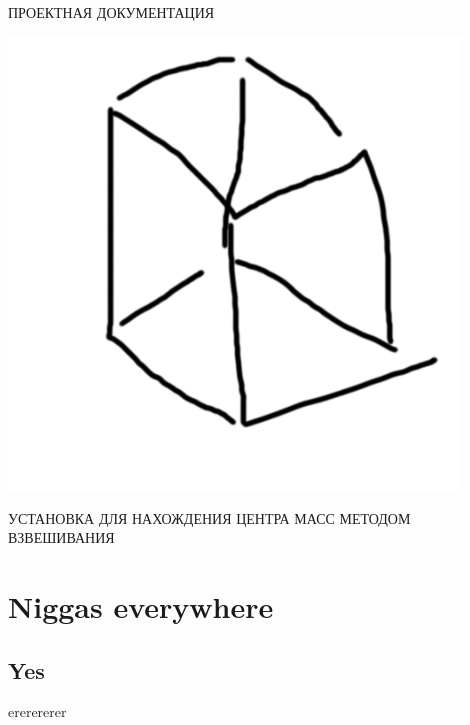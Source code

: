 \documentclass{report}
\begin{document}
	\begin{titlepage}

	\color{MidnightBlue}
	\fontsize{36}{42}\setlength{\parindent}{0pt}
	\selectfont
	\begin{flushleft}
	\uppercase{
		Проектная документация
	}
	\end{flushleft}
	\vspace{1cm}
	\begin{center}
	\includegraphics[width=12cm]{testPic}
	\end{center}
	\begin{flushleft}
	\color{Gray}
	\huge
	\uppercase{
		Установка для нахождения центра масс методом взвешивания
	}
	\end{flushleft}
	\end{titlepage}

	\tableofcontents

	\chapter{Niggas everywhere}

	\section{Yes}
		ererererer
\end{document}
